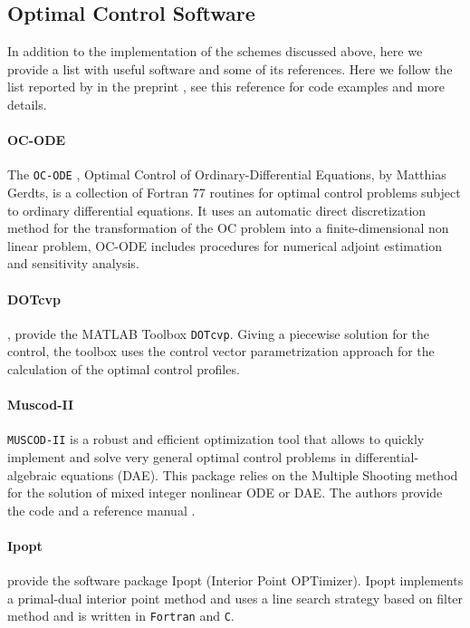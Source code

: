 \subsection{Optimal Control Software}
  In addition to the implementation of the schemes discussed above, here we provide a list with 
useful software and some of its references. Here we follow the list reported
by \citeauthor*{Rodrigues2014a} in the preprint \cite{Rodrigues2014a}, see this 
reference for code examples and more details.
\medskip
\paragraph{OC-ODE}
  The \verb|OC-ODE| \cite{Gerdts2009}, Optimal Control of Ordinary-Differential 
Equations, by Matthias Gerdts, is a collection of Fortran 77 routines for 
optimal control problems subject to ordinary differential equations. It uses an 
automatic direct discretization method for the transformation of the OC problem 
into a finite-dimensional non linear problem, OC-ODE includes procedures for 
numerical adjoint estimation and sensitivity analysis. 
\medskip
\paragraph{DOTcvp}
  \citet{Hirmajer2009}, provide the MATLAB Toolbox \verb|DOTcvp|. Giving a 
piecewise solution for the control, the toolbox uses the control vector 
parametrization approach for the calculation of the  optimal control profiles. 
\medskip
\paragraph{Muscod-II}
  
  \verb|MUSCOD-II| is a robust and efficient optimization tool that allows to
quickly implement and solve very general optimal control problems in 
differential-algebraic equations (DAE). This package relies on the Multiple 
Shooting method for the solution of mixed integer nonlinear ODE or DAE. The 
authors%
provide the code and a reference manual 
\cite{Diehl2001}.
\medskip
\paragraph{Ipopt}
  \citet*{Wachter2006} provide the software package Ipopt (Interior Point 
  OPTimizer). Ipopt implements a primal-dual interior point method and uses a 
  line search strategy based on filter method and is written in \verb|Fortran| 
  and \verb|C|.
\medskip  
